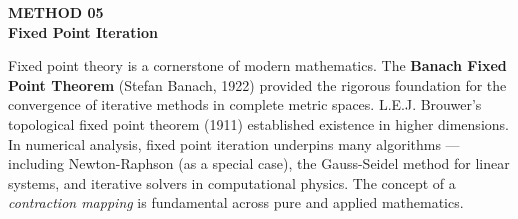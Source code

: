 \documentclass[12pt]{article}
\begin{document}
\newpage


\begin{tcolorbox}[
  enhanced, arc=0pt, boxrule=0pt,
  colback=primary, colframe=primary,
  left=16pt, right=16pt, top=14pt, bottom=10pt,
  borderline south={4pt}{0pt}{accent},
]
  {\color{accent!70}\small\bfseries METHOD 05}\\[4pt]
  {\LARGE\bfseries\color{white} Fixed Point Iteration}
\end{tcolorbox}

\vspace{10pt}

\begin{histbox}
Fixed point theory is a cornerstone of modern mathematics. The \textbf{Banach Fixed Point Theorem} (Stefan Banach, 1922) provided the rigorous foundation for the convergence of iterative methods in complete metric spaces. L.E.J. Brouwer's topological fixed point theorem (1911) established existence in higher dimensions. In numerical analysis, fixed point iteration underpins many algorithms — including Newton-Raphson (as a special case), the Gauss-Seidel method for linear systems, and iterative solvers in computational physics. The concept of a \textit{contraction mapping} is fundamental across pure and applied mathematics.
\end{histbox}

\bigskip
\end{document}
